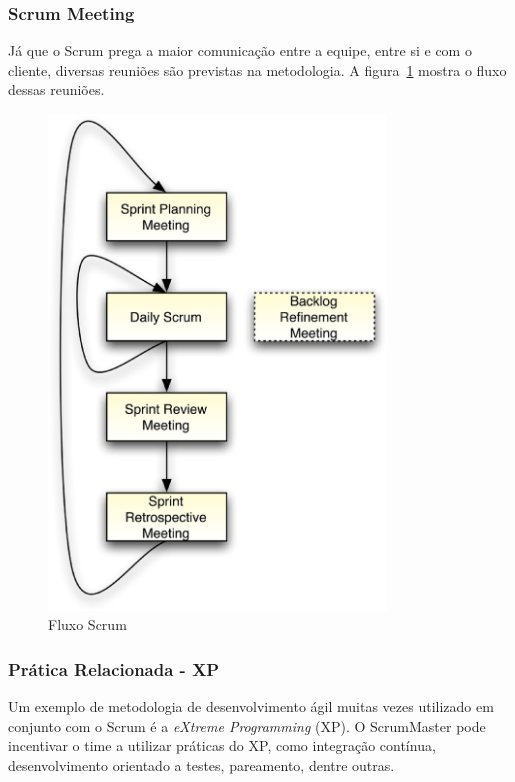 \subsubsection{Scrum Meeting}

Já que o Scrum prega a maior comunicação entre a equipe, entre si e com o cliente,
diversas reuniões são previstas na metodologia. A figura~\ref{fig:scrum_flow}
mostra o fluxo dessas reuniões.

\begin{figure}[H]
  \centering
  \includegraphics[width=0.8\textwidth]{figuras/scrum_flow.eps}
  \caption{Fluxo Scrum}
  \label{fig:scrum_flow}
\end{figure}

\subsubsection{Prática Relacionada - XP}

Um exemplo de metodologia de desenvolvimento ágil muitas vezes utilizado em
conjunto com o Scrum é a \textit{eXtreme Programming} (XP). O ScrumMaster pode
incentivar o time a utilizar práticas do XP, como integração contínua, 
desenvolvimento orientado a testes, pareamento, dentre outras.

